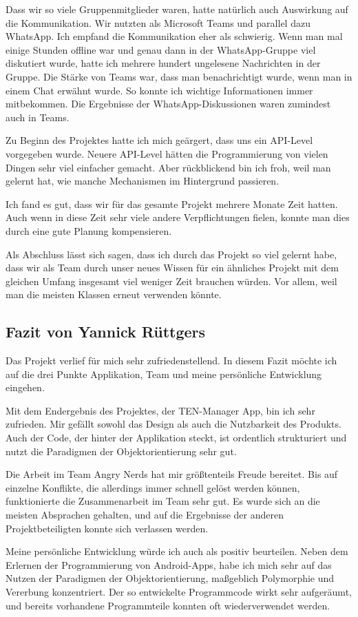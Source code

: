 Dass wir so viele Gruppenmitglieder waren, hatte natürlich auch Auswirkung auf die Kommunikation. Wir nutzten als Microsoft Teams und parallel dazu WhatsApp. Ich empfand die Kommunikation eher als schwierig. Wenn man mal einige Stunden offline war und genau dann in der WhatsApp-Gruppe viel diskutiert wurde, hatte ich mehrere hundert ungelesene Nachrichten in der Gruppe. Die Stärke von Teams war, dass man benachrichtigt wurde, wenn man in einem Chat erwähnt wurde. So konnte ich wichtige Informationen immer mitbekommen. Die Ergebnisse der WhatsApp-Diskussionen waren zumindest auch in Teams.

Zu Beginn des Projektes hatte ich mich geärgert, dass uns ein API-Level vorgegeben wurde. Neuere API-Level hätten die Programmierung von vielen Dingen sehr viel einfacher gemacht. Aber rückblickend bin ich froh, weil man gelernt hat, wie manche Mechanismen im Hintergrund passieren.

Ich fand es gut, dass wir für das gesamte Projekt mehrere Monate Zeit hatten. Auch wenn in diese Zeit sehr viele andere Verpflichtungen fielen, konnte man dies durch eine gute Planung kompensieren.

Als Abschluss lässt sich sagen, dass ich durch das Projekt so viel gelernt habe, dass wir als Team durch unser neues Wissen für ein ähnliches Projekt mit dem gleichen Umfang insgesamt viel weniger Zeit brauchen würden. Vor allem, weil man die meisten Klassen erneut verwenden könnte.

\subsection{Fazit von Yannick Rüttgers}

Das Projekt verlief für mich sehr zufriedenstellend. In diesem Fazit möchte ich auf die drei Punkte Applikation, Team und meine persönliche Entwicklung eingehen.

Mit dem Endergebnis des Projektes, der TEN-Manager App, bin ich sehr zufrieden. Mir gefällt sowohl das Design als auch die Nutzbarkeit des Produkts. Auch der Code, der hinter der Applikation steckt, ist ordentlich strukturiert und nutzt die Paradigmen der Objektorientierung sehr gut.

Die Arbeit im Team Angry Nerds hat mir größtenteils Freude bereitet. Bis auf einzelne Konflikte, die allerdings immer schnell gelöst werden können, funktionierte die Zusammenarbeit im Team sehr gut. Es wurde sich an die meisten Absprachen gehalten, und auf die Ergebnisse der anderen Projektbeteiligten konnte sich verlassen werden.

Meine persönliche Entwicklung würde ich auch als positiv beurteilen. Neben dem Erlernen der Programmierung von Android-Apps, habe ich mich sehr auf das Nutzen der Paradigmen der Objektorientierung, maßgeblich Polymorphie und Vererbung konzentriert. Der so entwickelte Programmcode wirkt sehr aufgeräumt, und bereits vorhandene Programmteile konnten oft wiederverwendet werden.



